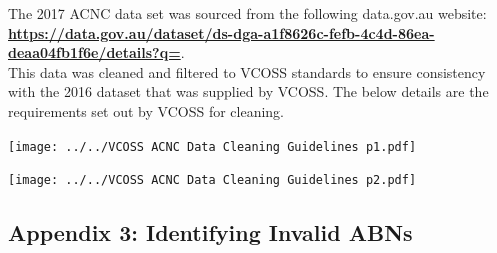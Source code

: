 \documentclass[
  11pt,
]{article}
\begin{document}
The 2017 ACNC data set was sourced from the following data.gov.au website:\\
\textbf{\url{https://data.gov.au/dataset/ds-dga-a1f8626c-fefb-4c4d-86ea-deaa04fb1f6e/details?q=}}.\\
This data was cleaned and filtered to VCOSS standards to ensure consistency with the 2016 dataset that was supplied by VCOSS. The below details are the requirements set out by VCOSS for cleaning.

\texttt{[image: ../../VCOSS ACNC Data Cleaning Guidelines p1.pdf]}

\texttt{[image: ../../VCOSS ACNC Data Cleaning Guidelines p2.pdf]}

\newpage

\hypertarget{appendix-3-identifying-invalid-abns}{%
\subsection{Appendix 3: Identifying Invalid ABNs}\label{appendix-3-identifying-invalid-abns}}
\end{document}
